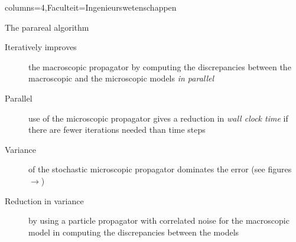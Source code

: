 \documentclass[portrait,a1paper,fontscale=0.45]{kuleuvenposter}
\begin{document}
\begin{poster}{columns=4,Faculteit=Ingenieurswetenschappen}
\begin{posterbox}%
[name=parareal micro-macro, column=1, above=bottom, boxColorOne=KULeuvenFaculteit!15!white, borderColor=KULeuvenFaculteit]%
{The parareal algorithm}
\begin{description}
\item[Iteratively improves] the macroscopic propagator by computing the discrepancies between the {\color{KULeuvenBlauw}macroscopic} and the {\color{KULeuvenFaculteit}microscopic} models \emph{in parallel}
\item[Parallel] use of the microscopic propagator gives a reduction in \emph{wall clock time} if there are fewer iterations needed than time steps
\item[Variance] of the stochastic microscopic propagator dominates the error (see figures $\rightarrow$)%
\item[Reduction in variance] by using a particle propagator with {\color{KULeuvenSecundair}correlated noise} for the macroscopic model in computing the discrepancies between the models
\end{description}

\end{posterbox}


\end{poster}
\end{document}
